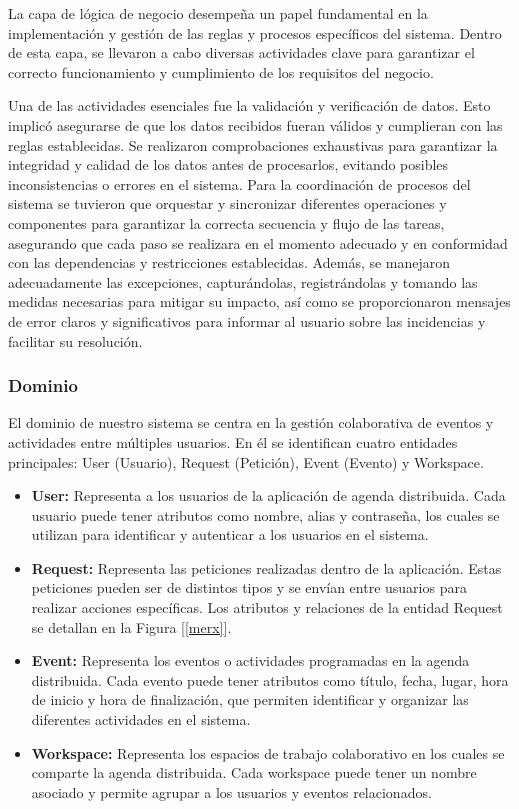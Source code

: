 \documentclass[10pt]{article} %
\begin{document}
	La capa de lógica de negocio desempeña un papel fundamental en la implementación y gestión de las reglas y procesos específicos del sistema. Dentro de esta capa, se llevaron a cabo diversas actividades clave para garantizar el correcto funcionamiento y cumplimiento de los requisitos del negocio.
	
	Una de las actividades esenciales fue la validación y verificación de datos. Esto implic\'o asegurarse de que los datos recibidos fueran válidos y cumplieran con las reglas establecidas. Se realizaron comprobaciones exhaustivas para garantizar la integridad y calidad de los datos antes de procesarlos, evitando posibles inconsistencias o errores en el sistema. Para la coordinaci\'on de procesos del sistema se tuvieron que orquestar y sincronizar diferentes operaciones y componentes para garantizar la correcta secuencia y flujo de las tareas, asegurando que cada paso se realizara en el momento adecuado y en conformidad con las dependencias y restricciones establecidas. Adem\'as, se manejaron adecuadamente las excepciones, capturándolas, registrándolas y tomando las medidas necesarias para mitigar su impacto, as\'i como se proporcionaron mensajes de error claros y significativos para informar al usuario sobre las incidencias y facilitar su resolución.
	
	
	\subsubsection{Dominio}	
	El dominio de nuestro sistema se centra en la gestión colaborativa de eventos y actividades entre múltiples usuarios. En \'el se identifican cuatro entidades principales: User (Usuario), Request (Petición), Event (Evento) y Workspace.
	\begin{itemize}
		\item \textbf{User:} Representa a los usuarios de la aplicación de agenda distribuida. Cada usuario puede tener atributos como nombre, alias y contraseña, los cuales se utilizan para identificar y autenticar a los usuarios en el sistema.
		\item \textbf{Request:} Representa las peticiones realizadas dentro de la aplicación. Estas peticiones pueden ser de distintos tipos y se envían entre usuarios para realizar acciones específicas. Los atributos y relaciones de la entidad Request se detallan en la Figura [\ref{merx}].
		\item \textbf{Event:} Representa los eventos o actividades programadas en la agenda distribuida. Cada evento puede tener atributos como título, fecha, lugar, hora de inicio y hora de finalización, que permiten identificar y organizar las diferentes actividades en el sistema.
		\item \textbf{Workspace:} Representa los espacios de trabajo colaborativo en los cuales se comparte la agenda distribuida. Cada workspace puede tener un nombre asociado y permite agrupar a los usuarios y eventos relacionados.
	\end{itemize}
\end{document}
